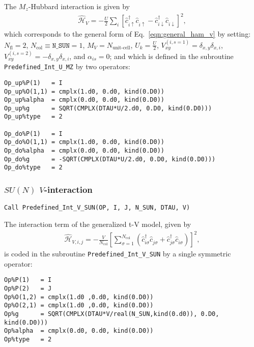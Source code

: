 The $M_z$-Hubbard interaction is given by 
\begin{align}
\hat{\mathcal{H}}_{V} = - \frac{U}{2}\sum\limits_{i}\left[
\hat{c}^{\dagger}_{i \uparrow} \hat{c}^{\phantom\dagger}_{i \uparrow}  -   \hat{c}^{\dagger}_{i \downarrow} \hat{c}^{\phantom\dagger}_{i \downarrow}  \right]^{2},
\end{align} 
which corresponds to the general form of Eq.~\eqref{eqn:general_ham_v} by setting: 
$N_{\mathrm{fl}} = 2$, $N_{\mathrm{col}} \equiv \texttt{N\_SUN} =1 $,  $M_V =  N_{\text{unit-cell}} $,  $U_{k} = \frac{U}{2}$, 
$V_{x y}^{(i, s=1)} =  \delta_{x,y} \delta_{x,i}  $,  $V_{x y}^{(i, s=2)} =  - \delta_{x,y} \delta_{x,i}  $, and $\alpha_{is}   = 0  $; and which is defined in the subroutine \texttt{Predefined\_Int\_U\_MZ} by two operators:
\begin{lstlisting}[style=fortran]
Op_up%P(1)   = I
Op_up%O(1,1) = cmplx(1.d0, 0.d0, kind(0.D0))
Op_up%alpha  = cmplx(0.d0, 0.d0, kind(0.D0))
Op_up%g      = SQRT(CMPLX(DTAU*U/2.d0, 0.D0, kind(0.D0))) 
Op_up%type   = 2

Op_do%P(1)   = I
Op_do%O(1,1) = cmplx(1.d0, 0.d0, kind(0.D0))
Op_do%alpha  = cmplx(0.d0, 0.d0, kind(0.D0))
Op_do%g      = -SQRT(CMPLX(DTAU*U/2.d0, 0.D0, kind(0.D0))) 
Op_do%type   = 2

\end{lstlisting}


\subsubsection{$SU(N)$ $V$-interaction}

\begin{lstlisting}[style=fortran]
Call Predefined_Int_V_SUN(OP, I, J, N_SUN, DTAU, V)
\end{lstlisting}

The interaction term of the generalized t-V model, given by 
\begin{align}
\hat{\mathcal{H}}_{V,i,j} =
-\frac{V}{N_\mathrm{col}}\left[ \sum_{\sigma=1}^{N_\mathrm{col}}\left( \hat{c}^{\dagger}_{i \sigma} \hat{c}^{\phantom\dagger}_{j \sigma} + \hat{c}^{\dagger}_{j \sigma} \hat{c}^{\phantom\dagger}_{i \sigma} \right) \right]^2,
\end{align} 
is coded in the subroutine \texttt{Predefined\_Int\_V\_SUN} by a single symmetric operator:
\begin{lstlisting}[style=fortran]
Op%P(1)   = I
Op%P(2)   = J
Op%O(1,2) = cmplx(1.d0 ,0.d0, kind(0.D0)) 
Op%O(2,1) = cmplx(1.d0 ,0.d0, kind(0.D0))
Op%g      = SQRT(CMPLX(DTAU*V/real(N_SUN,kind(0.d0)), 0.D0, kind(0.D0))) 
Op%alpha  = cmplx(0.d0, 0.d0, kind(0.D0))
Op%type   = 2

\end{lstlisting}


